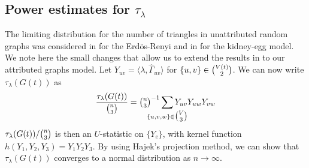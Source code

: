 \documentclass[final]{IEEEtran}
\theoremstyle{definition}
\def\clap#1{\hbox to 0pt{\hss#1\hss}}
\def\mathclap{\mathpalette\mathclapinternal}
\def\mathclapinternal#1#2{%
\clap{$\mathsurround=0pt#1{#2}$}%
}
\begin{document}
\subsection{Power estimates for $\tau_{\lambda}$}
\label{sec:power-estim-tau_l}
The limiting distribution for the number of triangles in unattributed
random graphs was considered in
\cite{nowicki88:_subgr_u_statis_method} for the Erd\"{o}s-Renyi 
and in \cite{rukhin09:_asymp_analy_various_statis_random_graph_infer}
for the kidney-egg model. We note here the small changes that allow us
to extend the results in
\cite{rukhin09:_asymp_analy_various_statis_random_graph_infer,%
nowicki88:_subgr_u_statis_method}
to our attributed graphs model. Let $Y_{uv} = \langle \lambda,
\widehat{\Gamma}_{uv} \rangle$ for $\{u,v\} \in \tbinom{V(t)}{2}$. We
can now write $\tau_{\lambda}(G(t))$ as
\begin{equation}
  \label{eq:45}
  \frac{\tau_{\lambda}(G(t))}{\tbinom{n}{3}} = \tbinom{n}{3}^{-1}
  \sum_{\mathclap{\{u,v,w\} \in \tbinom{V}{3}}} Y_{uv} Y_{uw} Y_{vw}
\end{equation}
$\tau_{\lambda}(G(t))/\tbinom{n}{3}$ is then an
$U$-statistic on $\{Y_{e}\}$, with kernel function $h(Y_{1}, Y_{2},
Y_{3}) = Y_{1} Y_{2} Y_{3}$. By using Hajek's projection method, we
can show that $\tau_{\lambda}(G(t))$ converges to a normal
distribution as $n \rightarrow \infty$. 
\end{document}
